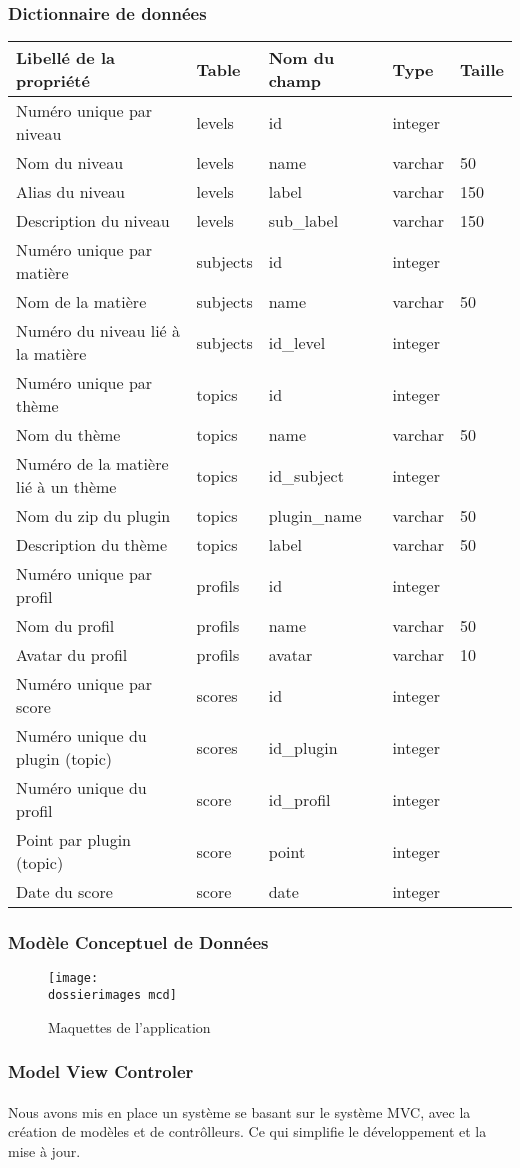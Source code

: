 \subsubsection{Dictionnaire de données}
\begin{tabbing}
\begin{tabular}{l l l l l}
	\hline
	Libellé de la propriété & Table & Nom du champ & Type & Taille \\
	\hline
	Numéro unique par niveau & levels & id & integer & \\	
	Nom du niveau & levels & name & varchar & 50 \\
	Alias du niveau & levels & label & varchar & 150 \\
	Description du niveau & levels & sub\_label & varchar & 150 \\
	Numéro unique par matière & subjects & id & integer & \\
	Nom de la matière & subjects & name & varchar & 50 \\
	Numéro du niveau lié à la matière & subjects & id\_level & integer	 & \\
	Numéro unique par thème & topics & id & integer & \\
	Nom du thème & topics & name & varchar & 50 \\
	Numéro de la matière lié à un thème & topics & id\_subject & 	integer & \\
	Nom du zip du plugin & topics & plugin\_name & varchar & 50 \\
	Description du thème & topics & label & varchar & 50 \\
	Numéro unique par profil & profils & id & integer & \\
	Nom du profil & profils & name & varchar & 50 \\
	Avatar du profil & profils & avatar & varchar & 10 \\
	Numéro unique par score & scores & id & integer & \\
	Numéro unique du plugin (topic) & scores & id\_plugin & integer & \\
	Numéro unique du profil & score & id\_profil & integer & \\
	Point par plugin (topic) & score & point & integer & \\
	Date du score & score & date & integer & \\
\end{tabular}
\end{tabbing}

\subsubsection{Modèle Conceptuel de Données}
\begin{figure}[H]
	\begin{center}
		\texttt{[image: \\dossierimages mcd]}
	\end{center}
	\caption{Maquettes de l'application}
	\label{Maquettes de l'application}
\end{figure}

\subsubsection{Model View Controler}
\paragraph{}Nous avons mis en place un système se basant sur le système MVC, avec la création de modèles et de contr\^{o}lleurs. Ce qui simplifie le développement et la mise à jour.